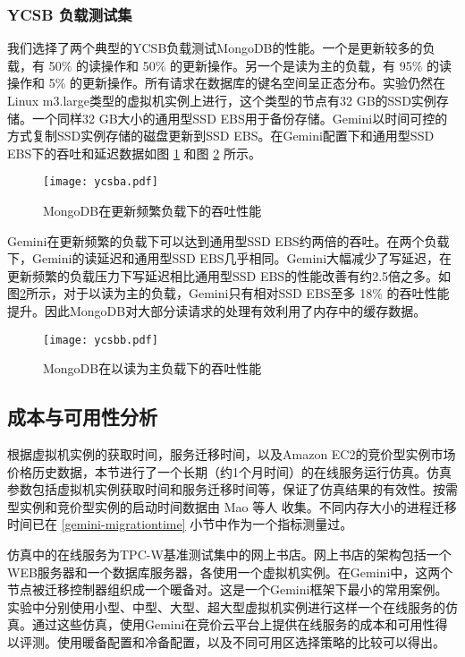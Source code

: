 \subsubsection{YCSB 负载测试集}
我们选择了两个典型的YCSB负载测试MongoDB的性能。一个是更新较多的负载，有 50\% 的读操作和 50\% 的更新操作。另一个是读为主的负载，有 95\% 的读操作和 5\% 的更新操作。所有请求在数据库的键名空间呈正态分布。实验仍然在Linux m3.large类型的虚拟机实例上进行，这个类型的节点有32 GB的SSD实例存储。一个同样32 GB大小的通用型SSD EBS用于备份存储。Gemini以时间可控的方式复制SSD实例存储的磁盘更新到SSD EBS。在Gemini配置下和通用型SSD EBS下的吞吐和延迟数据如图 \ref{figure:ycsba} 和图 \ref{figure:ycsbb} 所示。
\begin{figure}[]
  \centering
  \texttt{[image: ycsba.pdf]}
  \caption{MongoDB在更新频繁负载下的吞吐性能}
  \label{figure:ycsba}
\end{figure}

Gemini在更新频繁的负载下可以达到通用型SSD EBS约两倍的吞吐。在两个负载下，Gemini的读延迟和通用型SSD EBS几乎相同。Gemini大幅减少了写延迟，在更新频繁的负载压力下写延迟相比通用型SSD EBS的性能改善有约2.5倍之多。如图\ref{figure:ycsbb}所示，对于以读为主的负载，Gemini只有相对SSD EBS至多 18\% 的吞吐性能提升。因此MongoDB对大部分读请求的处理有效利用了内存中的缓存数据。
\begin{figure}[]
  \centering
  \texttt{[image: ycsbb.pdf]}
  \caption{MongoDB在以读为主负载下的吞吐性能}
  \label{figure:ycsbb}
\end{figure}

\subsection{成本与可用性分析}
根据虚拟机实例的获取时间，服务迁移时间，以及Amazon EC2的竞价型实例市场价格历史数据，本节进行了一个长期（约1个月时间）的在线服务运行仿真。仿真参数包括虚拟机实例获取时间和服务迁移时间等，保证了仿真结果的有效性。按需型实例和竞价型实例的启动时间数据由 Mao 等人 \cite{Mao:2012:PSV:2353730.2353859} 收集。不同内存大小的进程迁移时间已在 \ref{gemini-migrationtime} 小节中作为一个指标测量过。

仿真中的在线服务为TPC-W基准测试集中的网上书店。网上书店的架构包括一个WEB服务器和一个数据库服务器，各使用一个虚拟机实例。在Gemini中，这两个节点被迁移控制器组织成一个暖备对。这是一个Gemini框架下最小的常用案例。实验中分别使用小型、中型、大型、超大型虚拟机实例进行这样一个在线服务的仿真。通过这些仿真，使用Gemini在竞价云平台上提供在线服务的成本和可用性得以评测。使用暖备配置和冷备配置，以及不同可用区选择策略的比较可以得出。

